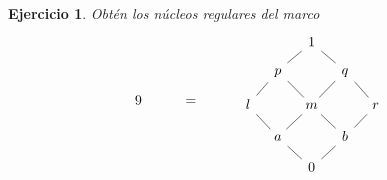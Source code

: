 \documentclass[12pt,letterpaper,titlepage]{article}
\newtheorem{exe}{Ejercicio}
\theoremstyle{definition}
\newcommand\<{\langle}
\renewcommand\>{\rangle}
\begin{document}
\begin{exe}%
    Obtén los núcleos regulares del marco
    \[
        9 \hspace{10mm} = \hspace{10mm} 
        \begin{tikzcd}[row sep=3mm, column sep=3mm]
            & & 1 \\
            & p \ar[ur,no head] && q \ar[ul,no head] \\
            l \ar[ur,no head]
                && m \ar[ul,no head] \ar[ur,no head]
                && r \ar[ul,no head] \\
            & a \ar[ul,no head]\ar[ur,no head]
                && b\ar[ul,no head]\ar[ur,no head] \\
            & & 0 \ar[ul,no head]\ar[ur,no head]
        \end{tikzcd}
    \]
\end{exe}
\end{document}
